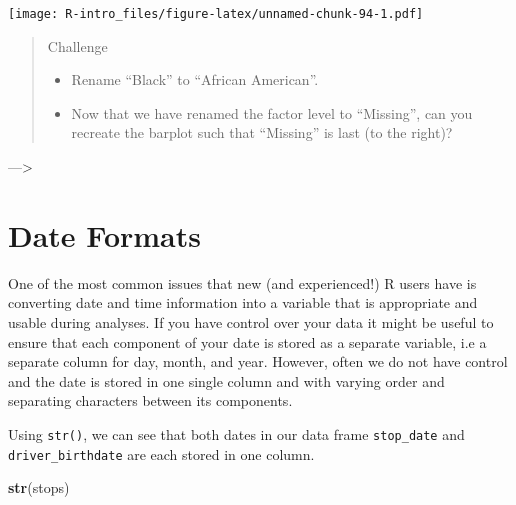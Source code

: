 \documentclass[
]{book}
\newenvironment{Shaded}{\begin{snugshade}}{\end{snugshade}}
\newcommand{\FunctionTok}[1]{\textcolor[rgb]{0.13,0.29,0.53}{\textbf{#1}}}
\newcommand{\NormalTok}[1]{#1}
\providecommand{\tightlist}{%
  \setlength{\itemsep}{0pt}\setlength{\parskip}{0pt}}
\begin{document}
\texttt{[image: R-intro\_files/figure-latex/unnamed-chunk-94-1.pdf]}

\begin{quote}
Challenge

\begin{itemize}
\tightlist
\item
  Rename ``Black'' to ``African American''.
\item
  Now that we have renamed the factor level to ``Missing'', can you recreate the
  barplot such that ``Missing'' is last (to the right)?
\end{itemize}
\end{quote}

---\textgreater{}

\hypertarget{date-formats}{%
\section{Date Formats}\label{date-formats}}

One of the most common issues that new (and experienced!) R users have is converting
date and time information into a variable that is appropriate and usable during
analyses. If you have control over your data it might be useful to ensure that each component of your date is stored as a separate
variable, i.e a separate column for day, month, and year. However, often we do not have control and the date is stored in one single column and with varying order and separating characters between its components.

Using \texttt{str()}, we can see that both dates in our data frame \texttt{stop\_date} and \texttt{driver\_birthdate} are each stored in one column.

\begin{Shaded}
\begin{Highlighting}[]
\FunctionTok{str}\NormalTok{(stops)}
\end{Highlighting}
\end{Shaded}
\end{document}
